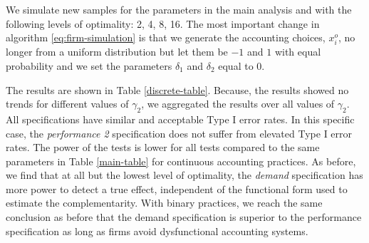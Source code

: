 \documentclass[12pt]{article}
\begin{document}
We simulate new samples for the parameters in the main analysis and with the following levels of optimality: 2, 4, 8, 16. The most important change in algorithm \eqref{eq:firm-simulation} is that we generate the accounting choices, $x_i^o$, no longer from a uniform distribution but let them be $-1$ and $1$ with equal probability and we set the parameters $\delta_1$ and $\delta_2$ equal to $0$.

The results are shown in Table \ref{discrete-table}. Because, the results showed no trends for different values of $\gamma_2$, we aggregated the results over all values of $\gamma_2$. All specifications have similar and acceptable Type I error rates. In this specific case, the \emph{performance 2} specification does not suffer from elevated Type I error rates. The power of the tests is lower for all tests compared to the same parameters in Table \ref{main-table} for continuous accounting practices. As before, we find that at all but the lowest level of optimality, the \emph{demand} specification has more power to detect a true effect, independent of the functional form used to estimate the complementarity. With binary practices, we reach the same conclusion as before that the demand specification is superior to the performance specification as long as firms avoid dysfunctional accounting systems. 


\end{document}
